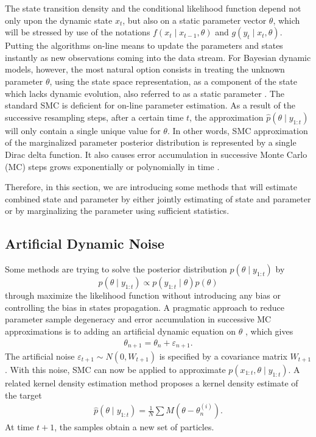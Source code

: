 The state transition density and the conditional likelihood function depend not only upon the dynamic state $x_t$, but also on a static parameter vector $\theta$, which will be stressed by use of the notations $f(x_t \mid x_{t-1},\theta)$ and $g(y_t\mid x_t,\theta)$. Putting the algorithms on-line means to update the parameters and states instantly as new observations coming into the data stream. For Bayesian dynamic models, however, the most natural option consists in treating the unknown parameter $\theta$, using the state space representation, as a component of the state which lacks dynamic evolution, also referred to as a static parameter \cite{cappe2007overview}. The standard SMC is deficient for on-line parameter estimation. As a result of the successive resampling steps, after a certain time $t$, the approximation $\hat{p}(\theta\mid y_{1:t})$ will only contain a single unique value for $\theta$. In other words, SMC approximation of the marginalized parameter posterior distribution is represented by a single Dirac delta function. It also causes error accumulation in successive Monte Carlo (MC) steps grows exponentially or polynomially in time \cite{kantas2009overview}. 

Therefore, in this section, we are introducing some methods that will estimate combined state and parameter by either jointly estimating of state and parameter or by marginalizing the parameter using sufficient statistics. 





\subsection{Artificial Dynamic Noise}\label{ArtificialNoise}

Some methods are trying to solve the posterior distribution $p(\theta \mid y_{1:t})$ by 
\begin{equation}
p(\theta \mid y_{1:t}) \propto p(y_{1:t} \mid \theta ) p(\theta )
\end{equation}
through maximize the likelihood function without introducing any bias or controlling the bias in states propagation. A pragmatic approach to reduce parameter sample degeneracy and error accumulation in successive MC approximations is to adding an artificial dynamic equation on $\theta$ \cite{higuchi2001self} \cite{kitagawa1998self}, which gives
\begin{align*}
\theta_{n+1} = \theta_n+\varepsilon_{n+1}.
\end{align*}
The artificial noise $\varepsilon_{t+1}\sim N(0,W_{t+1})$ is specified by a covariance matrix $W_{t+1}$. With this noise, SMC can now be applied to approximate $p(x_{1:t},\theta\mid y_{1:t})$. A related kernel density estimation method proposes a kernel density estimate of the target \cite{liu2001combined} \begin{align*}
\hat{p}(\theta\mid y_{1:t}) = \frac{1}{N}\sum M(\theta-\theta_n^{(i)}). 
\end{align*} 
At time $t+1$, the samples obtain a new set of particles. 


